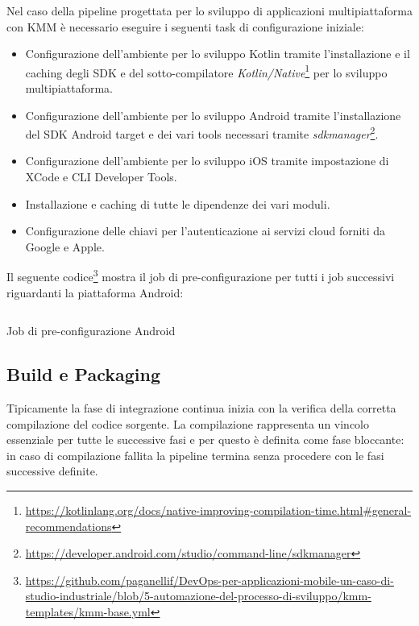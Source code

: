 Nel caso della pipeline progettata per lo sviluppo di applicazioni multipiattaforma con KMM è necessario eseguire i seguenti task di configurazione iniziale:
\begin{itemize}
    \item Configurazione dell'ambiente per lo sviluppo Kotlin tramite l'installazione e il caching degli SDK e del sotto-compilatore \textit{Kotlin/Native}\footnote{\href{https://kotlinlang.org/docs/native-improving-compilation-time.html\#general-recommendations}{https://kotlinlang.org/docs/native-improving-compilation-time.html\#general-recommendations}} per lo sviluppo multipiattaforma.
    \item Configurazione dell'ambiente per lo sviluppo Android tramite l'installazione del SDK Android target e dei vari tools necessari tramite \textit{sdkmanager}\footnote{\href{https://developer.android.com/studio/command-line/sdkmanager}{https://developer.android.com/studio/command-line/sdkmanager}}.
    \item Configurazione dell'ambiente per lo sviluppo iOS tramite impostazione di XCode e CLI Developer Tools.
    \item Installazione e caching di tutte le dipendenze dei vari moduli.
    \item Configurazione delle chiavi per l'autenticazione ai servizi cloud forniti da Google e Apple.
\end{itemize}

Il seguente codice\footnote{\href{https://github.com/paganellif/DevOps-per-applicazioni-mobile-un-caso-di-studio-industriale/blob/5-automazione-del-processo-di-sviluppo/kmm-templates/kmm-base.yml}{https://github.com/paganellif/DevOps-per-applicazioni-mobile-un-caso-di-studio-industriale/blob/5-automazione-del-processo-di-sviluppo/kmm-templates/kmm-base.yml}} mostra il job di pre-configurazione per tutti i job successivi riguardanti la piattaforma Android:

\begin{listing}[H]
    \inputminted{yaml}{code/pre-android-job.yaml}
    \caption{Job di pre-configurazione Android}
\end{listing}

\subsection{Build e Packaging}
Tipicamente la fase di integrazione continua inizia con la verifica della corretta compilazione del codice sorgente. La compilazione rappresenta un vincolo essenziale per tutte le successive fasi e per questo è definita come fase bloccante: in caso di compilazione fallita la pipeline termina senza procedere con le fasi successive definite.

